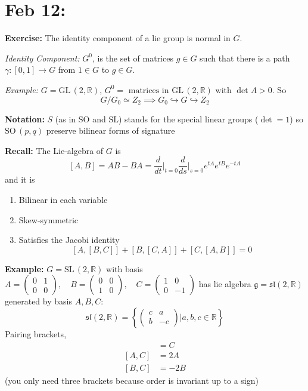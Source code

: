 \documentclass[12pt]{article}
\newcommand{\R}{\mathbb{R}}
\newcommand{\SL}{\text{SL}\,}
\newcommand{\SO}{\text{SO}\,}
\newcommand{\GL}{\text{GL}\,}
\newcommand{\g}{\mathfrak{g}}
\begin{document}
\section{Feb 12:}
    \textbf{Exercise:} The identity component of a lie group is normal in $G$. 

    \emph{Identity Component:} $G^0$, is the set of matrices $g \in G$ such that there is a path $\gamma: [0, 1] \to G$ from $1 \in G$ to $g \in G$. 

    \emph{Example:} $G= \GL(2, \R)$, $G^0 = \text{ matrices in } \GL(2, \R) \text{ with } \det A > 0$. So 
    \[G/G_0 \simeq Z_2 \implies G_0 \hookrightarrow G \hookrightarrow Z_2\]

    \textbf{Notation:} $S$ (as in $\text{SO}$ and $\text{SL}$) stands for the special linear groups ($\det = 1$) so $\SO(p, q)$ preserve bilinear forms of signature

    \textbf{Recall:} The Lie-algebra of $G$ is 
    \[[A, B] = AB - BA = \frac{d}{dt}\bigg\vert_{t=0}\frac{d}{ds}\bigg\vert_{s=0} e^{tA}e^{tB}e^{-tA}\] 
    and it is 
    \begin{enumerate}
        \item Bilinear in each variable 
        \item Skew-symmetric
        \item Satisfies the Jacobi identity
        \[[A, [B, C]] + [B, [C, A]] + [C, [A, B]] = 0\]
    \end{enumerate}

    \textbf{Example:} $G = \SL(2, \R)$ with basis $A = \begin{pmatrix}
        0 & 1\\ 
        0 & 0
    \end{pmatrix}, \quad B = \begin{pmatrix}
        0 & 0\\ 
        1 & 0
    \end{pmatrix}, \quad C = \begin{pmatrix}
        1 & 0\\ 
        0 & -1
    \end{pmatrix}$ has lie algebra $\g = \mathfrak{sl}(2, \R)$ generated by basis $A, B, C$:
    \[\mathfrak{sl}(2, \R) = \left\{\begin{pmatrix}
        c & a\\ 
        b & -c
    \end{pmatrix} \bigg\vert a, b, c \in \R\right\}\] 
    Pairing brackets, 
    \begin{align*}
        [A, B] &= C\\ 
        [A, C] &= 2A\\ 
        [B, C] &= -2B
    \end{align*}
    (you only need three brackets because order is invariant up to a sign) 
\end{document}
